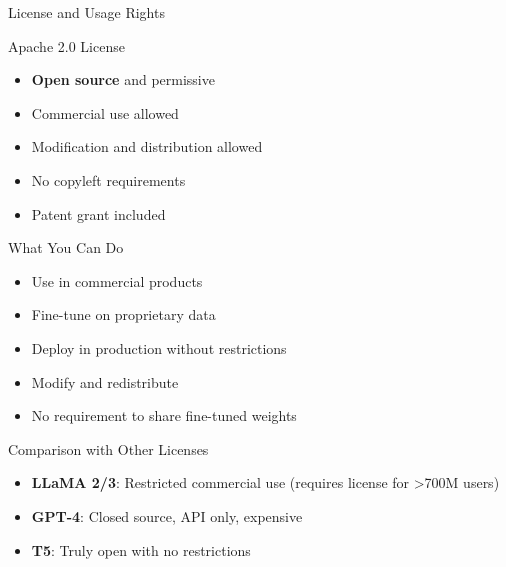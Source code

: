 \begin{frame}{License and Usage Rights}
\begin{block}{Apache 2.0 License}
\begin{itemize}
  \item \textbf{Open source} and permissive
  \item Commercial use allowed
  \item Modification and distribution allowed
  \item No copyleft requirements
  \item Patent grant included
\end{itemize}
\end{block}

\begin{block}{What You Can Do}
\begin{itemize}
  \item Use in commercial products
  \item Fine-tune on proprietary data
  \item Deploy in production without restrictions
  \item Modify and redistribute
  \item No requirement to share fine-tuned weights
\end{itemize}
\end{block}

\begin{block}{Comparison with Other Licenses}
\begin{itemize}
  \item \textbf{LLaMA 2/3}: Restricted commercial use (requires license for >700M users)
  \item \textbf{GPT-4}: Closed source, API only, expensive
  \item \textbf{T5}: Truly open with no restrictions
\end{itemize}
\end{block}
\end{frame}

